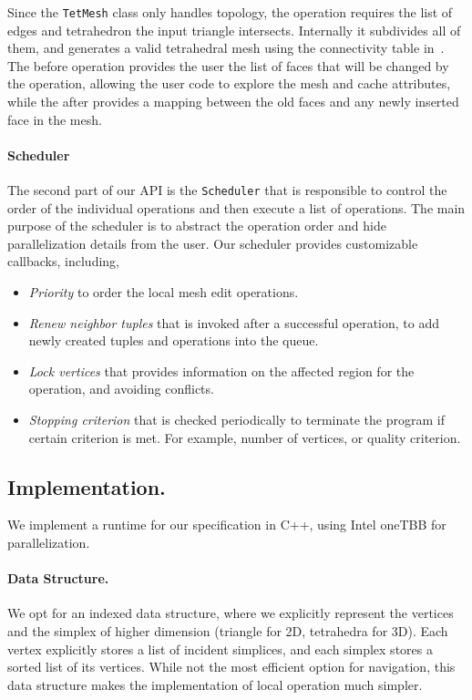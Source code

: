 Since the \texttt{TetMesh} class only handles topology, the operation requires the list of edges and tetrahedron the input triangle intersects. Internally it subdivides all of them, and generates a valid tetrahedral mesh using the connectivity table in~\cite{Hu:2019:fTetWild}. The before operation provides the user the list of  faces that will be changed by the operation, allowing the user code to explore the mesh and cache attributes,  while the after provides a mapping between the old faces and any newly inserted face in the mesh.


\paragraph{Scheduler}
The second part of our API is the \texttt{Scheduler} that is responsible to control the order of the individual operations and then execute a list of operations. The main purpose of the scheduler is to abstract the operation order and hide parallelization details from the user. Our scheduler provides customizable callbacks, including,
\begin{itemize}
    \item \emph{Priority} to order the local mesh edit operations.
    \item \emph{Renew neighbor tuples} that is invoked after a successful operation, to add newly created tuples and operations into the queue.
    \item \emph{Lock vertices} that provides information on the affected region for the operation, and avoiding conflicts.
    \item \emph{Stopping criterion} that is checked periodically to terminate the program if certain criterion is met. For example, number of vertices, or quality criterion.
\end{itemize}






\subsection{Implementation.}

We implement a runtime for our specification in C++, using Intel oneTBB for parallelization.

\paragraph{Data Structure.} We opt for an indexed data structure, where we explicitly represent the vertices and the simplex of higher dimension (triangle for 2D, tetrahedra for 3D). Each vertex explicitly stores a list of incident simplices, and each simplex stores a sorted list of its vertices. While not the most efficient option for navigation, this data structure makes the implementation of local operation much simpler. 

